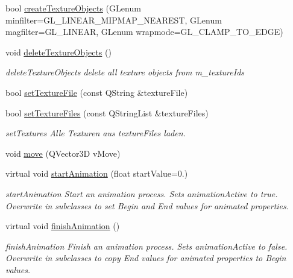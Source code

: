 \begin{DoxyCompactItemize}
\item 
bool \mbox{\hyperlink{class_g_l_body_a760a4221bb18ac880c10c41984e4257b}{create\+Texture\+Objects}} (G\+Lenum minfilter=G\+L\+\_\+\+L\+I\+N\+E\+A\+R\+\_\+\+M\+I\+P\+M\+A\+P\+\_\+\+N\+E\+A\+R\+E\+ST, G\+Lenum magfilter=G\+L\+\_\+\+L\+I\+N\+E\+AR, G\+Lenum wrapmode=G\+L\+\_\+\+C\+L\+A\+M\+P\+\_\+\+T\+O\+\_\+\+E\+D\+GE)
\item 
\mbox{\label{class_g_l_body_abf93cad4d78b161c63f2990ef3f618e4}} 
void \mbox{\hyperlink{class_g_l_body_abf93cad4d78b161c63f2990ef3f618e4}{delete\+Texture\+Objects}} ()
\begin{DoxyCompactList}\small\item\em delete\+Texture\+Objects delete all texture objects from m\+\_\+texture\+Ids \end{DoxyCompactList}\item 
bool \mbox{\hyperlink{class_g_l_body_ac912257e45e99c68c011da7f2d5d3708}{set\+Texture\+File}} (const Q\+String \&texture\+File)
\item 
bool \mbox{\hyperlink{class_g_l_body_a1338ad47f62e8a12f280ad169e78cd09}{set\+Texture\+Files}} (const Q\+String\+List \&texture\+Files)
\begin{DoxyCompactList}\small\item\em set\+Textures Alle Texturen aus texture\+Files laden. \end{DoxyCompactList}\item 
void \mbox{\hyperlink{class_g_l_body_aa716fdbc46e14434e28b893dad1b87f1}{move}} (Q\+Vector3D v\+Move)
\item 
virtual void \mbox{\hyperlink{class_g_l_body_a5620eb1389c1aeb5694e4e7fc8a9e88c}{start\+Animation}} (float start\+Value=0.)
\begin{DoxyCompactList}\small\item\em start\+Animation Start an animation process. Sets animation\+Active to true. Overwrite in subclasses to set Begin and End values for animated properties. \end{DoxyCompactList}\item 
\mbox{\label{class_g_l_body_a1bcb3503a1758fef20d2bb1f9726b85a}} 
virtual void \mbox{\hyperlink{class_g_l_body_a1bcb3503a1758fef20d2bb1f9726b85a}{finish\+Animation}} ()
\begin{DoxyCompactList}\small\item\em finish\+Animation Finish an animation process. Sets animation\+Active to false. Overwrite in subclasses to copy End values for animated properties to Begin values. \end{DoxyCompactList}\item 

\end{DoxyCompactItemize}
